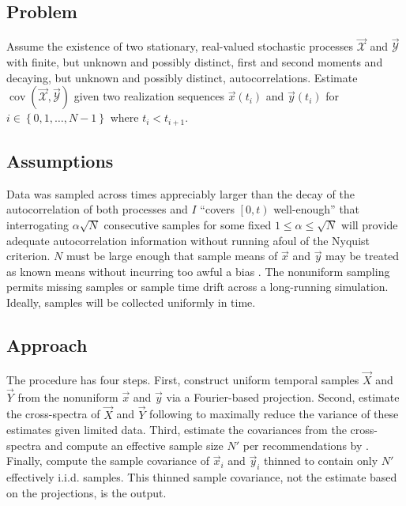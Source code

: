 \documentclass[letterpaper,11pt,nointlimits,reqno]{amsart}
\DeclareMathOperator{\cov}{cov}
\begin{document}
\subsection*{Problem}

Assume the existence of two stationary, real-valued stochastic processes
$\vec{\mathscr{X}}$ and $\vec{\mathscr{Y}}$ with finite, but unknown and
possibly distinct, first and second moments and decaying, but unknown and
possibly distinct, autocorrelations.  Estimate
$\cov\left(\vec{\mathscr{X}},\vec{\mathscr{Y}}\right)$ given two realization
sequences $\vec{x}\left(t_i\right)$ and $\vec{y}\left(t_i\right)$ for
$i\in\left\{0,1,\dots,N-1\right\}$ where $t_i < t_{i+1}$.

\subsection*{Assumptions}

Data was sampled across times appreciably larger than the decay of the
autocorrelation of both processes and $I$ ``covers $\left[0,t\right)$
well-enough'' that interrogating $\alpha \sqrt{N}$ consecutive samples for some
fixed $1\le\alpha\le\sqrt{N}$ will provide adequate autocorrelation information
without running afoul of the Nyquist criterion.  $N$ must be large enough that
sample means of $\vec{x}$ and $\vec{y}$ may be treated as known means without
incurring too awful a bias \citep[see][]{Percival1993Three}.  The nonuniform
sampling permits missing samples or sample time drift across a long-running
simulation.  Ideally, samples will be collected uniformly in time.

\subsection*{Approach}

The procedure has four steps.  First, construct uniform temporal samples
$\vec{X}$ and $\vec{Y}$ from the nonuniform $\vec{x}$ and $\vec{y}$ via a
Fourier-based projection.  Second, estimate the cross-spectra of $\vec{X}$ and
$\vec{Y}$ following \citet{Welch1967Use} to maximally reduce the variance of
these estimates given limited data.  Third, estimate the covariances from the
cross-spectra and compute an effective sample size $N'$ per recommendations by
\citet{Thiebaux1984Interpretation}.  Finally, compute the sample covariance of
$\vec{x}_i$ and $\vec{y}_i$ thinned to contain only $N'$ effectively i.i.d.
samples.  This thinned sample covariance, not the estimate based on the
projections, is the output.
\end{document}
